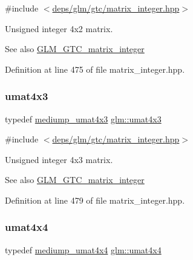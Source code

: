 {\ttfamily \#include $<$\hyperlink{matrix__integer_8hpp}{deps/glm/gtc/matrix\+\_\+integer.\+hpp}$>$}

Unsigned integer 4x2 matrix. \begin{DoxySeeAlso}{See also}
\hyperlink{group__gtc__matrix__integer}{G\+L\+M\+\_\+\+G\+T\+C\+\_\+matrix\+\_\+integer} 
\end{DoxySeeAlso}


Definition at line 475 of file matrix\+\_\+integer.\+hpp.

\mbox{\label{group__gtc__matrix__integer_ga08373f5588a54da1a48e5e55c7d51004}} 
\subsubsection{\texorpdfstring{umat4x3}{umat4x3}}
{\footnotesize\ttfamily typedef \hyperlink{group__gtc__matrix__integer_ga974bc32af0686378c4696208c3103d96}{mediump\+\_\+umat4x3} \hyperlink{group__gtc__matrix__integer_ga08373f5588a54da1a48e5e55c7d51004}{glm\+::umat4x3}}



{\ttfamily \#include $<$\hyperlink{matrix__integer_8hpp}{deps/glm/gtc/matrix\+\_\+integer.\+hpp}$>$}

Unsigned integer 4x3 matrix. \begin{DoxySeeAlso}{See also}
\hyperlink{group__gtc__matrix__integer}{G\+L\+M\+\_\+\+G\+T\+C\+\_\+matrix\+\_\+integer} 
\end{DoxySeeAlso}


Definition at line 479 of file matrix\+\_\+integer.\+hpp.

\mbox{\label{group__gtc__matrix__integer_gae0931b79e808fb0983848778a60eb548}} 
\subsubsection{\texorpdfstring{umat4x4}{umat4x4}}
{\footnotesize\ttfamily typedef \hyperlink{group__gtc__matrix__integer_ga0dcca70aa643639489cf52acf7574e6c}{mediump\+\_\+umat4x4} \hyperlink{group__gtc__matrix__integer_gae0931b79e808fb0983848778a60eb548}{glm\+::umat4x4}}



